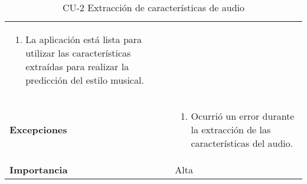 \begin{table}[p]
\begin{tabularx}{\linewidth}{ p{} p{} }
\begin{enumerate}
			\item La aplicación está lista para utilizar las características extraídas para realizar la predicción del estilo musical.
		\end{enumerate}\\
		\textbf{Excepciones} &
		\begin{enumerate}
			\def\labelenumi{\arabic{enumi}.}
			\tightlist
			\item Ocurrió un error durante la extracción de las características del audio.
		\end{enumerate}\\
		\textbf{Importancia}          & Alta \\
		\bottomrule
	\end{tabularx}
	\caption{CU-2 Extracción de características de audio}
\end{table}

